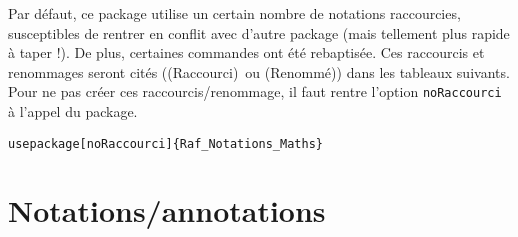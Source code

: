 \documentclass[a4paper,10pt]{article}
\newcommand{\rac}{({\color{red}Raccourci})}
\newcommand{\ren}{({\color{blue}Renommé})}
\begin{document}
	Par défaut, ce package utilise un certain nombre de notations raccourcies, susceptibles de rentrer en conflit avec d'autre package (mais tellement plus rapide à taper !).
	De plus, certaines commandes ont été rebaptisée.
	Ces raccourcis et renommages seront cités (\rac\ ou \ren) dans les tableaux suivants.
	Pour ne pas créer ces raccourcis/renommage, il faut rentre l'option \verb!noRaccourci! à l'appel du package.

	\begin{verbatim}
usepackage[noRaccourci]{Raf_Notations_Maths}
	\end{verbatim}

	\section{Notations/annotations}
	\noindent
\end{document}
